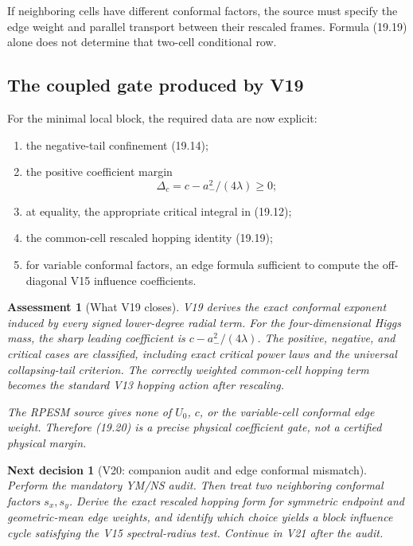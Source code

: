 \documentclass[11pt]{article}
\newtheorem{decision}[theorem]{Next decision}
\newtheorem{assessment}[theorem]{Assessment}
\theoremstyle{remark}
\begin{document}
If neighboring cells have different conformal factors, the source
must specify the edge weight and parallel transport between their
rescaled frames.  Formula (19.19) alone does not determine that
two-cell conditional row.

\subsection{The coupled gate produced by V19}

For the minimal local block, the required data are now explicit:
\begin{enumerate}
\item the negative-tail confinement (19.14);
\item the positive coefficient margin
      \[
      \Delta_c
      =c-a_-^2/(4\lambda)\geq0;                    \tag{19.20}
      \]
\item at equality, the appropriate critical integral in (19.12);
\item the common-cell rescaled hopping identity (19.19);
\item for variable conformal factors, an edge formula sufficient
      to compute the off-diagonal V15 influence coefficients.
\end{enumerate}

\begin{assessment}[What V19 closes]
\label{ass:v17v19-status}
V19 derives the exact conformal exponent induced by every signed
lower-degree radial term.  For the four-dimensional Higgs mass, the
sharp leading coefficient is
\(c-a_-^2/(4\lambda)\).  The positive, negative, and critical cases
are classified, including exact critical power laws and the
universal collapsing-tail criterion.  The correctly weighted
common-cell hopping term becomes the standard V13 hopping action
after rescaling.

The RPESM source gives none of \(U_0\), \(c\), or the variable-cell
conformal edge weight.  Therefore (19.20) is a precise physical
coefficient gate, not a certified physical margin.
\end{assessment}

\begin{decision}[V20: companion audit and edge conformal mismatch]
\label{dec:v17v19-next}
Perform the mandatory YM/NS audit.  Then treat two neighboring
conformal factors \(s_x,s_y\).  Derive the exact rescaled hopping
form for symmetric endpoint and geometric-mean edge weights, and
identify which choice yields a block influence cycle satisfying
the V15 spectral-radius test.  Continue in V21 after the audit.
\end{decision}
\end{document}
